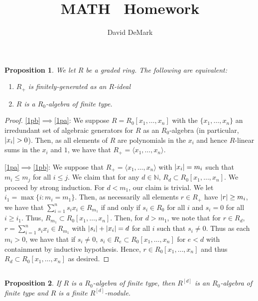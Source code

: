 \documentclass[english,letter,doublesided]{article}
\title{MATH \course~Homework \Roman{hwn}}
\author{David DeMark}
\date{\due}
\DeclarePairedDelimiter\abs{\lvert}{\rvert}%
\newcommand{\NN}{\mathbb{N}}
\newcommand{\prob}[1]{\setcounter{section}{#1-1}\section{}}
\newcommand{\prt}[1]{\setcounter{subsection}{#1-1}\subsection{}}
\newtheorem*{prop*}{Proposition}
\theoremstyle{remark}
\theoremstyle{definition}
\newcommand{\idl}[1]{\langle #1 \rangle}
\begin{document}
\maketitle
	\prob{1}\prt{1}
	\begin{prop*}
		We let $R$ be a graded ring. The following are equivalent:
		\begin{enumerate}[label=(\alph*)]
			\item$R_+$ is finitely-generated as an $R$-ideal\label{1pa}
			\item $R$ is a $R_0$-algebra of finite type.\label{1pb}
		\end{enumerate}
	\end{prop*}
	\begin{proof}
		\ref{1pb}$\implies$\ref{1pa}: We suppose $R=R_0[x_1,\dots,x_n]$ with the $\{x_1,\dots,x_n\}$ an irredundant set of algebraic generators for $R$ as an $R_0$-algebra (in particular, $\abs{x_i}>0$). Then, as all elements of $R$ are polynomials in the $x_i$ and hence $R$-linear sums in the $x_i$ and $1$, we have that $R_+=\idl{x_1,\dots,x_n}$. 
		
		\ref{1pa}$\implies$\ref{1pb}: We suppose that $R_+=\idl{x_1,\dots,x_n}$ with $\abs{x_i}=m_i$ such that $m_i\leq m_j$ for all $i\leq j$. We claim that for any $d\in \NN$, $R_d\subset R_0[x_1,\dots,x_n]$. We proceed by strong induction. For $d<m_1$, our claim is trivial. We let $i_1=\max\{i:m_i=m_1\}$. Then, as necessarily all elements $r\in R_+$ have $\abs{r}\geq m_i$, we have that $\sum_{i=1}^ns_ix_i\in R_{m_1}$ if and only if $s_i\in R_0$ for all $i$ and $s_i=0$ for all $i\geq i_1$. Thus, $R_{m_1}\subset R_0[x_1,\dots,x_n]$. Then, for $d>m_1$, we note that for $r\in R_d$, $r=\sum_{i=1}^ns_ix_i\in R_{m_1}$  with $\abs{s_i}+\abs{x_i}=d$ for all $i$ such that $s_i\neq 0$. Thus as each $m_i>0$, we have that if $s_i\neq 0$, $s_i\in R_{e}\subset R_0[x_1,\dots, x_n]$ for $e<d$ with containment by inductive hypothesis. Hence, $r\in R_0[x_1,\dots,x_n]$ and thus $R_d\subset R_0[x_1,\dots,x_n]$ as desired. 
	\end{proof}
	\prt{2}\begin{prop*}
		If $R$ is a $R_0$-algebra of finite type, then $R^{[d]}$ is an $R_0$-algebra of finite type and $R$ is a finite $R^{[d]}$-module.
	\end{prop*}
\end{document}
